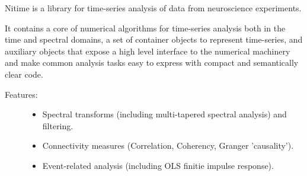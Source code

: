 \documentclass[a4paper,english]{article}
\begin{document}
Nitime is a library for time-series analysis of data from neuroscience
experiments.

It contains a core of numerical algorithms for time-series analysis both in
the time and spectral domains, a set of container objects to represent
time-series, and auxiliary objects that expose a high level interface to the
numerical machinery and make common analysis tasks easy to express with
compact and semantically clear code.
%
\begin{description}
\item[{Features:}] \leavevmode %
\begin{itemize}

\item Spectral transforms (including multi-tapered spectral analysis) and
filtering.

\item Connectivity measures (Correlation, Coherency, Granger 'causality').

\item Event-related analysis (including OLS finitie impulse response).

\end{itemize}

\end{description}
\begin{figure}
\noindent{}
\end{figure}
\end{document}
